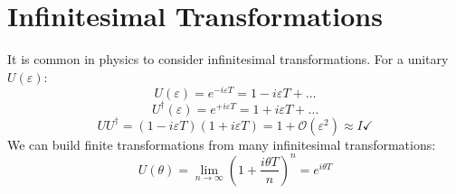 \documentclass[12pt]{article}
\begin{document}
\section*{Infinitesimal Transformations}

It is common in physics to consider infinitesimal transformations. 
For a unitary $U(\varepsilon)$:
\begin{equation*}
  U(\varepsilon) = e^{-i\varepsilon T} = 1 - i\varepsilon T + \ldots
\end{equation*}
\begin{equation*}
  U^{\dagger}(\varepsilon) = e^{+i\varepsilon T} = 1 + i\varepsilon T + \ldots
\end{equation*}
\begin{equation*}
  UU^{\dagger} = (1 - i\varepsilon T)(1 + i\varepsilon T) = 1 + \mathcal{O}(\varepsilon^2) \approx I \checkmark
\end{equation*}
We can build finite transformations from many infinitesimal transformations:
\begin{equation*}
  U(\theta) = \lim_{n\to\infty}\left(1 + \frac{i\theta T}{n}\right)^n = e^{i\theta T}
\end{equation*}
\end{document}
